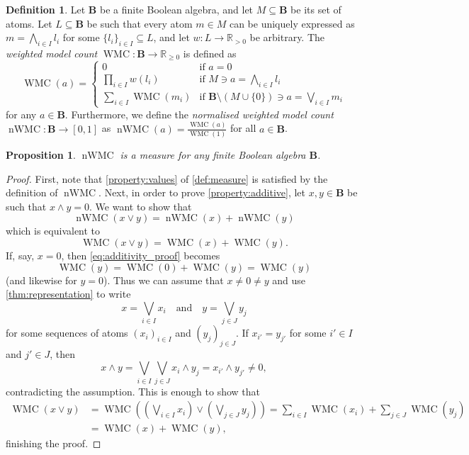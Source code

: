 \documentclass{article}
\newtheorem{proposition}{Proposition}
\theoremstyle{definition}
\newtheorem{definition}{Definition}
\theoremstyle{remark}
\DeclareMathOperator{\WMC}{WMC}
\DeclareMathOperator{\nWMC}{nWMC}
\begin{document}
\begin{definition} \label{def:wmc}
  Let $\mathbf{B}$ be a finite Boolean algebra, and let $M \subseteq \mathbf{B}$
  be its set of atoms. Let $L \subseteq \mathbf{B}$ be such that every atom $m
  \in M$ can be uniquely expressed as $m = \bigwedge_{i \in I} l_i$ for some $\{
  l_i \}_{i \in I} \subseteq L$, and let $w\colon L \to \mathbb{R}_{>0}$ be
  arbitrary. The \emph{weighted model count} $\WMC\colon \mathbf{B} \to
  \mathbb{R}_{\ge 0}$ is defined as
  \[
    \WMC(a) = \begin{cases}
      0 & \text{if } a = 0 \\
      \prod_{i \in I} w(l_i) & \text{if } M \ni a = \bigwedge_{i \in I} l_i \\
      \sum_{i \in I} \WMC(m_i) & \text{if } \mathbf{B} \setminus (M \cup \{ 0
      \}) \ni a = \bigvee_{i \in I} m_i
    \end{cases}
  \]
  for any $a \in \mathbf{B}$. Furthermore, we define the \emph{normalised
    weighted model count} $\nWMC\colon \mathbf{B} \to [0, 1]$ as $\nWMC(a) =
  \frac{\WMC(a)}{\WMC(1)}$ for all $a \in \mathbf{B}$.
\end{definition}

\begin{proposition}
  $\nWMC$ is a measure for any finite Boolean algebra $\mathbf{B}$.
\end{proposition}
\begin{proof}
  First, note that \cref{property:values} of \cref{def:measure} is satisfied by
  the definition of $\nWMC$. Next, in order to prove \cref{property:additive},
  let $x, y \in \mathbf{B}$ be such that $x \land y = 0$. We want to show that
  \[
    \nWMC(x \lor y) = \nWMC(x) + \nWMC(y)
  \]
  which is equivalent to
  \begin{equation} \label{eq:additivity_proof}
    \WMC(x \lor y) = \WMC(x) + \WMC(y).
  \end{equation}
  If, say, $x = 0$, then \cref{eq:additivity_proof} becomes
  \[
    \WMC(y) = \WMC(0) + \WMC(y) = \WMC(y)
  \]
  (and likewise for $y = 0$). Thus we can assume that $x \ne 0 \ne y$ and use
  \cref{thm:representation} to write
  \[
    x = \bigvee_{i \in I} x_i \quad \text{and} \quad y = \bigvee_{j \in J} y_j
  \]
  for some sequences of atoms $(x_i)_{i \in I}$ and $(y_j)_{j \in J}$. If
  $x_{i'} = y_{j'}$ for some $i' \in I$ and $j' \in J$, then
  \[
    x \land y = \bigvee_{i \in I} \bigvee_{j \in J} x_i \land y_j = x_{i'} \land
    y_{j'} \ne 0,
  \]
  contradicting the assumption. This is enough to show that
  \begin{align*}
    \WMC(x \lor y) &= \WMC\left( \left( \bigvee_{i \in I} x_i \right) \lor \left(\bigvee_{j \in J} y_j \right) \right) = \sum_{i \in I} \WMC(x_i) + \sum_{j \in J} \WMC(y_j) \\
                   &= \WMC(x) + \WMC(y),
  \end{align*}
  finishing the proof.
\end{proof}
\end{document}
